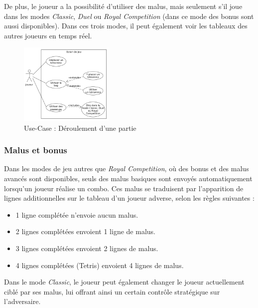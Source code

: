 \documentclass{report}
\begin{document}
\noindent De plus, le joueur a la possibilité d'utiliser des malus, mais seulement s'il joue dans les modes \emph{Classic}, \emph{Duel} ou \emph{Royal Competition} (dans ce mode des bonus sont aussi disponibles). Dans ces trois modes, il peut également voir les tableaux des autres joueurs en temps réel.

\begin{figure}[H]
    \centering
     \includegraphics[width=0.4\textwidth, keepaspectratio]{src/user_req/jeu.png}
    \caption{Use-Case : Déroulement d'une partie}
    \label{fig:use_case_game}
\end{figure}

\subsubsection{Malus et bonus}

\noindent Dans les modes de jeu autres que \emph{Royal Competition}, où des bonus et des malus avancés sont disponibles, seuls des malus basiques sont envoyés automatiquement lorsqu'un joueur réalise un combo. Ces malus se traduisent par l'apparition de lignes additionnelles sur le tableau d'un joueur adverse, selon les règles suivantes :
\begin{itemize}
    \item 1 ligne complétée n'envoie aucun malus.
    \item 2 lignes complétées envoient 1 ligne de malus.
    \item 3 lignes complétées envoient 2 lignes de malus.
    \item 4 lignes complétées (Tetris) envoient 4 lignes de malus. \\
\end{itemize}

\vspace{-1em}

\noindent Dans le mode \emph{Classic}, le joueur peut également changer le joueur actuellement ciblé par ses malus, lui offrant ainsi un certain contrôle stratégique sur l’adversaire. \\
\end{document}
